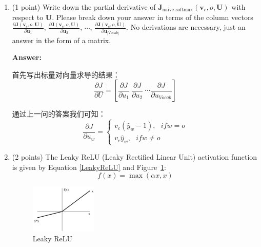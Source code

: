 \documentclass{article}
\newenvironment{answer}{
    {\bf Answer:} \sf \begingroup \color{red}%
}{\par\endgroup}%
\begin{document}
\begin{enumerate}[label=(\alph*)]
\item (1 point) Write down the partial derivative of $\bm J_{\text{naive-softmax}}(\bm v_c, o, \bm U)$ with respect to $\bm U$. Please break down your answer in terms of the column vectors $\frac{\partial \bm J(\bm v_c, o, \bm U)}{\partial \bm u_1}$, $\frac{\partial \bm J(\bm v_c, o, \bm U)}{\partial \bm u_2}$, $\cdots$, $\frac{\partial \bm J(\bm v_c, o, \bm U)}{\partial \bm u_{|\text{Vocab}|}}$. No derivations are necessary, just an answer in the form of a matrix.
\begin{shaded}
\begin{answer}
	首先写出标量对向量求导的结果：
	\begin{equation}
		\frac{\partial J}{\partial U} = \left[ \frac{\partial J}{\partial u_1}\ \frac{\partial J}{\partial u_2}\ \cdots \frac{\partial J}{\partial u_{Vocab}} \right]
	\end{equation}
	
	通过上一问的答案我们可知：
	\begin{equation}
	\frac{\partial J}{\partial u_w} = \left\{
	\begin{array}{l}
		v_c (\hat{y}_{w} - 1),\ \ \ if w=o \\
		v_c \hat{y}_{w}, \ \ \ if w\neq o
	\end{array}
	\right.
\end{equation}


\end{answer}
\end{shaded}

\item (2 points) The Leaky ReLU (Leaky Rectified Linear Unit) activation function is given by Equation \ref{LeakyReLU} and Figure~\ref{fig:leaky_relu}:
\begin{equation}
    \label{LeakyReLU}
    f(x) = \max(\alpha x, x)
\end{equation}

\begin{figure}[h]
    \centering
    \includegraphics[width=0.3\textwidth]{leaky_relu_graph.png}
    \caption{Leaky ReLU}
    \label{fig:leaky_relu}
\end{figure}


\end{enumerate}
\end{document}
